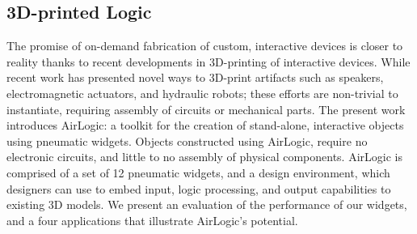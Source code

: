     \subsection*{3D-printed Logic}
      The promise of on-demand fabrication of custom, interactive devices is
      closer to reality thanks to recent developments in 3D-printing of
      interactive devices. While recent work has presented novel ways to
      3D-print artifacts such as speakers, electromagnetic actuators, and
      hydraulic robots; these efforts are non-trivial to instantiate,
      requiring assembly of circuits or mechanical parts. The present work
      introduces AirLogic: a toolkit for the creation of stand-alone,
      interactive objects using pneumatic widgets. Objects constructed using
      AirLogic, require no electronic circuits, and little to no assembly of
      physical components. AirLogic is comprised of a set of 12 pneumatic
      widgets, and a design environment, which designers can use to embed
      input, logic processing, and output capabilities to existing 3D models.
      We present an evaluation of the performance of our widgets, and a four
      applications that illustrate AirLogic's potential.